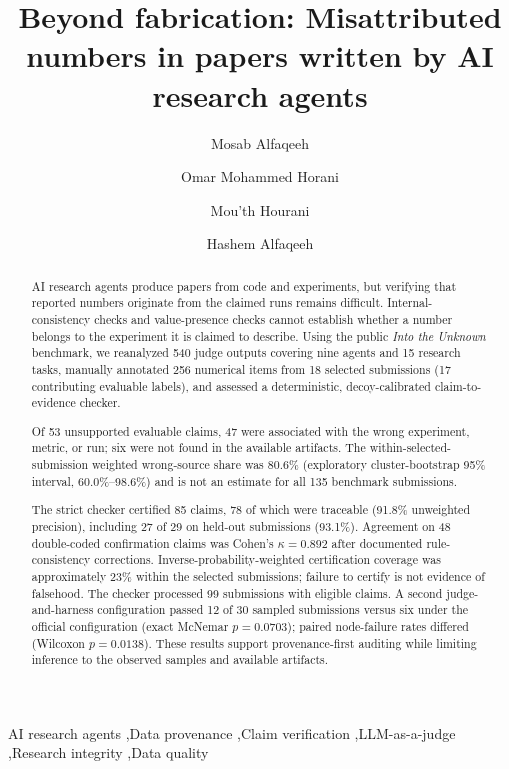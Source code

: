 \documentclass[preprint,12pt,authoryear]{elsarticle}
\newif\ifanon \anonfalse
\begin{document}
\begin{frontmatter}
\title{Beyond fabrication: Misattributed numbers in papers written by AI research agents}

\ifanon
\else
\author[aau]{Mosab Alfaqeeh}
\author[aau]{Omar Mohammed Horani}
\author[aau]{Mou'th Hourani}
\author[bing]{Hashem Alfaqeeh}
\fi

\begin{abstract}
AI research agents produce papers from code and experiments, but verifying that reported numbers originate from the claimed runs remains difficult. Internal-consistency checks and value-presence checks cannot establish whether a number belongs to the experiment it is claimed to describe. Using the public \emph{Into the Unknown} benchmark, we reanalyzed 540 judge outputs covering nine agents and 15 research tasks, manually annotated 256 numerical items from 18 selected submissions (17 contributing evaluable labels), and assessed a deterministic, decoy-calibrated claim-to-evidence checker.

Of 53 unsupported evaluable claims, 47 were associated with the wrong experiment, metric, or run; six were not found in the available artifacts. The within-selected-submission weighted wrong-source share was 80.6\% (exploratory cluster-bootstrap 95\% interval, 60.0\%--98.6\%) and is not an estimate for all 135 benchmark submissions.

The strict checker certified 85 claims, 78 of which were traceable (91.8\% unweighted precision), including 27 of 29 on held-out submissions (93.1\%). Agreement on 48 double-coded confirmation claims was Cohen's $\kappa=0.892$ after documented rule-consistency corrections. Inverse-probability-weighted certification coverage was approximately 23\% within the selected submissions; failure to certify is not evidence of falsehood. The checker processed 99 submissions with eligible claims. A second judge-and-harness configuration passed 12 of 30 sampled submissions versus six under the official configuration (exact McNemar $p=0.0703$); paired node-failure rates differed (Wilcoxon $p=0.0138$). These results support provenance-first auditing while limiting inference to the observed samples and available artifacts.
\end{abstract}

\begin{keyword}
AI research agents \sep Data provenance \sep Claim verification \sep LLM-as-a-judge \sep Research integrity \sep Data quality
\end{keyword}
\end{frontmatter}
\end{document}
